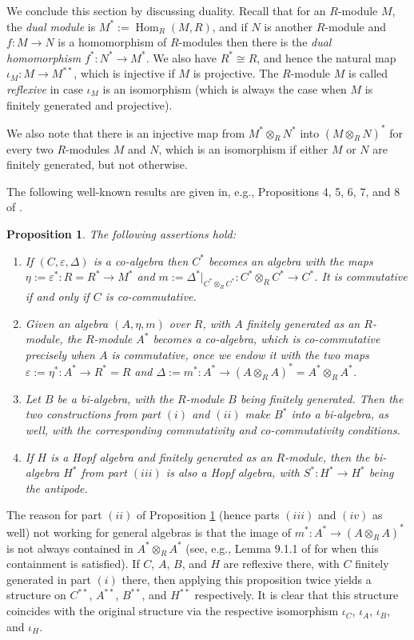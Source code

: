 \documentclass{article}
\newtheorem{prop}[thm]{Proposition}
\theoremstyle{definition}
\begin{document}
\medskip

We conclude this section by discussing duality. Recall that for an $R$-module $M$, the \emph{dual module} is $M^{*}:=\operatorname{Hom}_{R}(M,R)$, and if $N$ is another $R$-module and $f:M \to N$ is a homomorphism of $R$-modules then there is the \emph{dual homomorphism} $f^{*}:N^{*} \to M^{*}$. We also have $R^{*} \cong R$, and hence the natural map $\iota_{M}:M \to M^{**}$, which is injective if $M$ is projective. The $R$-module $M$ is called \emph{reflexive} in case $\iota_{M}$ is an isomorphism (which is always the case when $M$ is finitely generated and projective).

We also note that there is an injective map from $M^{*}\otimes_{R}N^{*}$ into $(M\otimes_{R}N)^{*}$ for every two $R$-modules $M$ and $N$, which is an isomorphism if either $M$ or $N$ are finitely generated, but not otherwise.

The following well-known results are given in, e.g., Propositions 4, 5, 6, 7, and 8 of \cite{[D]}.
\begin{prop}
The following assertions hold:
\begin{enumerate}[$(i)$]
\item If $(C,\varepsilon,\Delta)$ is a co-algebra then $C^{*}$ becomes an algebra with the maps $\eta:=\varepsilon^{*}:R=R^{*} \to M^{*}$ and $m:=\Delta^{*}|_{C^{*}\otimes_{R}C^{*}}:C^{*}\otimes_{R}C^{*} \to C^{*}$. It is commutative if and only if $C$ is co-commutative.
\item Given an algebra $(A,\eta,m)$ over $R$, with $A$ finitely generated as an $R$-module, the $R$-module $A^{*}$ becomes a co-algebra, which is co-commutative precisely when $A$ is commutative, once we endow it with the two maps $\varepsilon:=\eta^{*}:A^{*} \to R^{*}=R$ and $\Delta:=m^{*}:A^{*}\to(A\otimes_{R}A)^{*}=A^{*}\otimes_{R}A^{*}$.
\item Let $B$ be a bi-algebra, with the $R$-module $B$ being finitely generated. Then the two constructions from part $(i)$ and $(ii)$ make $B^{*}$ into a bi-algebra, as well, with the corresponding commutativity and co-commutativity conditions.
\item If $H$ is a Hopf algebra and finitely generated as an $R$-module, then the bi-algebra $H^{*}$ from part $(iii)$ is also a Hopf algebra, with $S^{*}:H^{*} \to H^{*}$ being the antipode.
\end{enumerate} \label{dual}
\end{prop}
The reason for part $(ii)$ of Proposition \ref{dual} (hence parts $(iii)$ and $(iv)$ as well) not working for general algebras is that the image of $m^{*}:A^{*}\to(A\otimes_{R}A)^{*}$ is not always contained in $A^{*}\otimes_{R}A^{*}$ (see, e.g., Lemma 9.1.1 of \cite{[Mo]} for when this containment is satisfied). If $C$, $A$, $B$, and $H$ are reflexive there, with $C$ finitely generated in part $(i)$ there, then applying this proposition twice yields a structure on $C^{**}$, $A^{**}$, $B^{**}$, and $H^{**}$ respectively. It is clear that this structure coincides with the original structure via the respective isomorphism $\iota_{C}$, $\iota_{A}$, $\iota_{B}$, and $\iota_{H}$.
\end{document}
